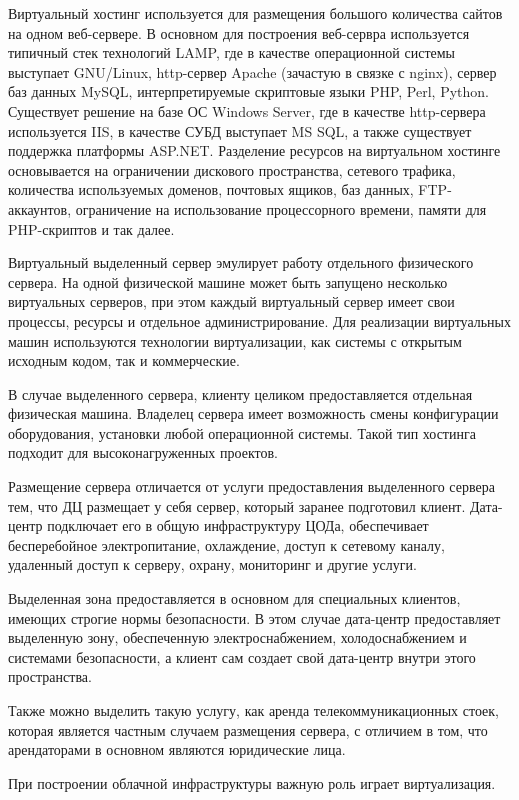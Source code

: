 Виртуальный хостинг используется для размещения большого количества сайтов на одном веб-сервере.
В основном для построения веб-сервра используется типичный стек технологий LAMP, где в качестве операционной системы выступает GNU/Linux, http-сервер Apache (зачастую в связке с nginx), сервер баз данных MySQL, интерпретируемые скриптовые языки PHP, Perl, Python.
Существует решение на базе ОС Windows Server, где в качестве http-сервера используется IIS, в качестве СУБД выступает MS SQL, а также существует поддержка платформы ASP.NET.
Разделение ресурсов на виртуальном хостинге основывается на ограничении дискового пространства, сетевого трафика, количества используемых доменов, почтовых ящиков, баз данных, FTP-аккаунтов, ограничение на использование процессорного времени, памяти для PHP-скриптов и так далее.

Виртуальный выделенный сервер эмулирует работу отдельного физического сервера.
На одной физической машине может быть запущено несколько виртуальных серверов, при этом каждый виртуальный сервер имеет свои процессы, ресурсы и отдельное администрирование.
Для реализации виртуальных машин используются технологии виртуализации, как системы с открытым исходным кодом, так и коммерческие.

В случае выделенного сервера, клиенту целиком предоставляется отдельная физическая машина.
Владелец сервера имеет возможность смены конфигурации оборудования, установки любой операционной системы.
Такой тип хостинга подходит для высоконагруженных проектов.

Размещение сервера отличается от услуги предоставления выделенного сервера тем, что ДЦ размещает у себя сервер, который заранее подготовил клиент.
Дата-центр подключает его в общую инфраструктуру ЦОДа, обеспечивает бесперебойное электропитание, охлаждение, доступ к сетевому каналу, удаленный доступ к серверу, охрану, мониторинг и другие услуги.

Выделенная зона предоставляется в основном для специальных клиентов, имеющих строгие нормы безопасности.
В этом случае дата-центр предоставляет выделенную зону, обеспеченную электроснабжением, холодоснабжением и системами безопасности, а клиент сам создает свой дата-центр внутри этого пространства.

Также можно выделить такую услугу, как аренда телекоммуникационных стоек, которая является частным случаем размещения сервера, с отличием в том, что арендаторами в основном являются юридические лица.

При построении облачной инфраструктуры важную роль играет виртуализация.

